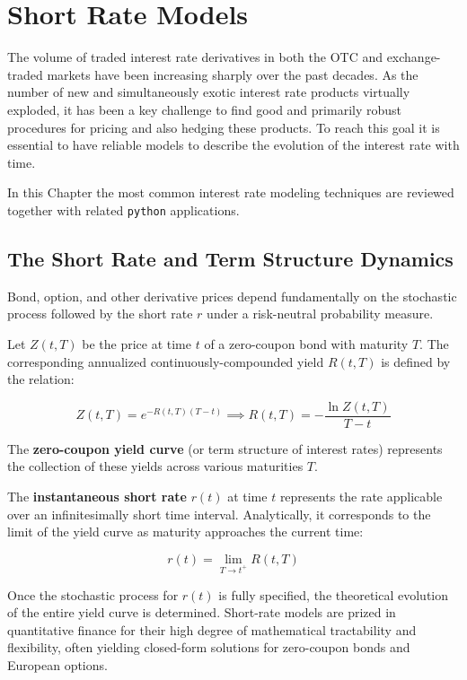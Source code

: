 \chapter{Short Rate Models}

The volume of traded interest rate derivatives in both the OTC and exchange-traded markets have been increasing sharply over the past decades. As the number of new and simultaneously exotic interest rate products virtually exploded, it has been a key challenge to find good and primarily robust procedures for pricing and also hedging these products. To reach this goal it is essential to have reliable models to describe the evolution of the interest rate with time.

In this Chapter the most common interest rate modeling techniques are reviewed together with related \texttt{python} applications.

\section{The Short Rate and Term Structure Dynamics}

Bond, option, and other derivative prices depend fundamentally on the stochastic process followed by the short rate $r$ under a risk-neutral probability measure.

Let $Z(t, T)$ be the price at time $t$ of a zero-coupon bond with maturity $T$. The corresponding annualized continuously-compounded yield $R(t, T)$ is defined by the relation:

$$Z(t, T) = e^{-R(t, T)(T-t)} \implies R(t, T) = -\frac{\ln Z(t, T)}{T-t}$$

The \textbf{zero-coupon yield curve} (or term structure of interest rates) represents the collection of these yields across various maturities $T$.

The \textbf{instantaneous short rate} $r(t)$ at time $t$ represents the rate applicable over an infinitesimally short time interval. Analytically, it corresponds to the limit of the yield curve as maturity approaches the current time:

$$r(t) = \lim_{T \to t^{+}} R(t, T)$$

Once the stochastic process for $r(t)$ is fully specified, the theoretical evolution of the entire yield curve is determined. Short-rate models are prized in quantitative finance for their high degree of mathematical tractability and flexibility, often yielding closed-form solutions for zero-coupon bonds and European options.

